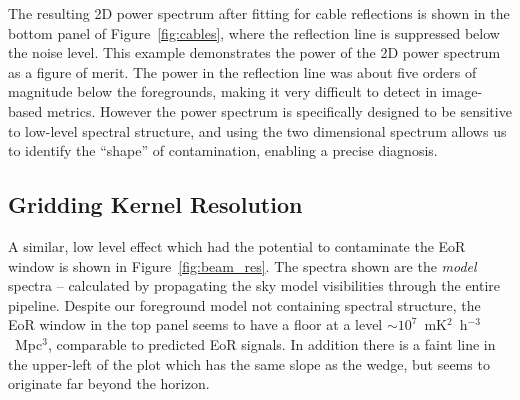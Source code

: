 \documentclass[iop]{emulateapj}
\begin{document}
The resulting 2D power spectrum after fitting for cable reflections is shown in the bottom 
panel of Figure~\ref{fig:cables}, where the reflection line is suppressed below the noise 
level. This example demonstrates the power of the 2D power spectrum as a figure of merit. 
The power in the reflection line was about five orders of magnitude below the foregrounds, 
making it very difficult to detect in image-based metrics. However the power spectrum is 
specifically designed to be sensitive to low-level spectral structure, and using the two 
dimensional spectrum allows us to identify the ``shape'' of contamination, enabling a 
precise diagnosis.

\subsection{Gridding Kernel Resolution}
A similar, low level effect which had the potential to contaminate the EoR window is shown 
in Figure~\ref{fig:beam_res}. The spectra shown are the \emph{model} spectra -- calculated 
by propagating the sky model visibilities through the entire pipeline. Despite our foreground 
model not containing spectral structure, the EoR window in the top panel seems to have a 
floor at a level $\sim 10^7$~mK$^2$~h$^{-3}$~Mpc$^3$, comparable to predicted EoR 
signals. In addition there is a faint line in the upper-left of the plot which has the same slope 
as the wedge, but seems to originate far beyond the horizon.
\end{document}
